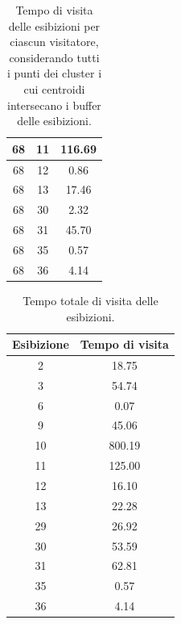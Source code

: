 \documentclass[12pt]{article}
\begin{document}
\begin{table}[!ht]
\begin{tabular}{|c|c|c|}
        68                  & 11                  & 116.69                   \\ \hline
        68                  & 12                  & 0.86                     \\ \hline
        68                  & 13                  & 17.46                    \\ \hline
        68                  & 30                  & 2.32                     \\ \hline
        68                  & 31                  & 45.70                    \\ \hline
        68                  & 35                  & 0.57                     \\ \hline
        68                  & 36                  & 4.14                     \\ \hline
        \end{tabular}
        \caption{Tempo di visita delle esibizioni per ciascun visitatore, considerando tutti i punti dei cluster i cui centroidi intersecano i buffer delle esibizioni.}
    \label{persons_time_visiting_cluster}
    \end{table}

    \begin{table}[!ht]
        \centering
        \begin{tabular}{|c|c|}
        \hline
        \textbf{Esibizione} & \textbf{Tempo di visita} \\ \hline
        2                   & 18.75                    \\ \hline
        3                   & 54.74                    \\ \hline
        6                   & 0.07                     \\ \hline
        9                   & 45.06                    \\ \hline
        10                  & 800.19                   \\ \hline
        11                  & 125.00                   \\ \hline
        12                  & 16.10                    \\ \hline
        13                  & 22.28                    \\ \hline
        29                  & 26.92                    \\ \hline
        30                  & 53.59                    \\ \hline
        31                  & 62.81                    \\ \hline
        35                  & 0.57                     \\ \hline
        36                  & 4.14                     \\ \hline
        \end{tabular}
        \caption{Tempo totale di visita delle esibizioni.}
        \label{exhibits_time_visiting}
    \end{table}
\end{document}
